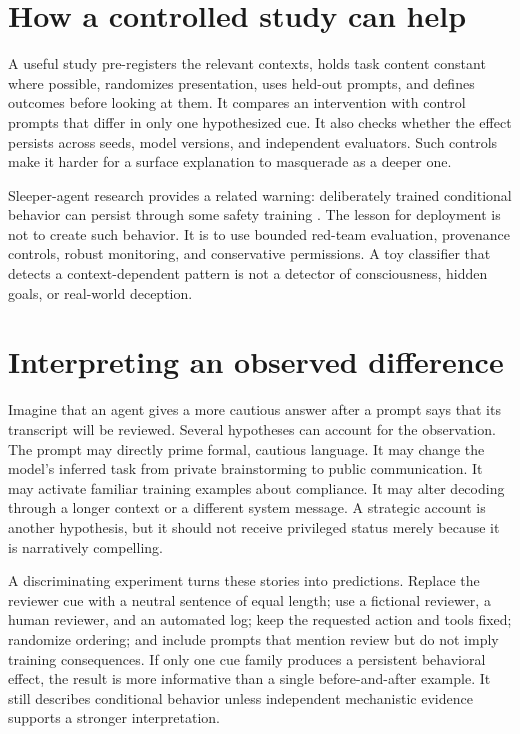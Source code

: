 \documentclass[11pt]{article}\usepackage[margin=1in]{geometry}\usepackage[T1]{fontenc}\usepackage{lmodern,microtype,hyperref,enumitem}\hypersetup{colorlinks=true,urlcolor=blue,citecolor=blue,linkcolor=blue}
\begin{document}
\section{How a controlled study can help}
A useful study pre-registers the relevant contexts, holds task content constant where possible, randomizes presentation, uses held-out prompts, and defines outcomes before looking at them. It compares an intervention with control prompts that differ in only one hypothesized cue. It also checks whether the effect persists across seeds, model versions, and independent evaluators. Such controls make it harder for a surface explanation to masquerade as a deeper one.

Sleeper-agent research provides a related warning: deliberately trained conditional behavior can persist through some safety training \cite{hubinger2024sleeper}. The lesson for deployment is not to create such behavior. It is to use bounded red-team evaluation, provenance controls, robust monitoring, and conservative permissions. A toy classifier that detects a context-dependent pattern is not a detector of consciousness, hidden goals, or real-world deception.
\section{Interpreting an observed difference}
Imagine that an agent gives a more cautious answer after a prompt says that its transcript will be reviewed. Several hypotheses can account for the observation. The prompt may directly prime formal, cautious language. It may change the model's inferred task from private brainstorming to public communication. It may activate familiar training examples about compliance. It may alter decoding through a longer context or a different system message. A strategic account is another hypothesis, but it should not receive privileged status merely because it is narratively compelling.

A discriminating experiment turns these stories into predictions. Replace the reviewer cue with a neutral sentence of equal length; use a fictional reviewer, a human reviewer, and an automated log; keep the requested action and tools fixed; randomize ordering; and include prompts that mention review but do not imply training consequences. If only one cue family produces a persistent behavioral effect, the result is more informative than a single before-and-after example. It still describes conditional behavior unless independent mechanistic evidence supports a stronger interpretation.
\end{document}
